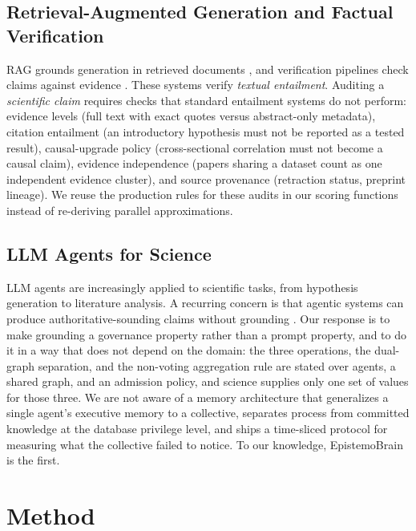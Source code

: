\subsection{Retrieval-Augmented Generation and Factual Verification}

RAG grounds generation in retrieved documents \citep{lewis2020retrieval}, and
verification pipelines check claims against evidence
\citep{thorne2018fever,wadden2020scifact,min2023factscore,dhuliawala2023chain}.
These systems verify \emph{textual entailment}. Auditing a \emph{scientific
claim} requires checks that standard entailment systems do not perform:
evidence levels (full text with exact quotes versus abstract-only metadata),
citation entailment (an introductory hypothesis must not be reported as a
tested result), causal-upgrade policy (cross-sectional correlation must not
become a causal claim), evidence independence (papers sharing a dataset count
as one independent evidence cluster), and source provenance (retraction
status, preprint lineage). We reuse the production rules for these audits in
our scoring functions instead of re-deriving parallel approximations.

\subsection{LLM Agents for Science}

LLM agents are increasingly applied to scientific tasks, from hypothesis
generation to literature analysis. A recurring concern is that agentic
systems can produce authoritative-sounding claims without grounding
\citep{ioannidis2005why,osc2015estimating}. Our response is to make grounding
a governance property rather than a prompt property, and to do it in a way that
does not depend on the domain: the three operations, the dual-graph separation,
and the non-voting aggregation rule are stated over agents, a shared graph, and
an admission policy, and science supplies only one set of values for those
three. We are not aware of a memory architecture that generalizes a single
agent's executive memory to a collective, separates process from committed
knowledge at the database privilege level, and ships a time-sliced protocol for
measuring what the collective failed to notice. To our knowledge, EpistemoBrain
is the first.

\section{Method}

